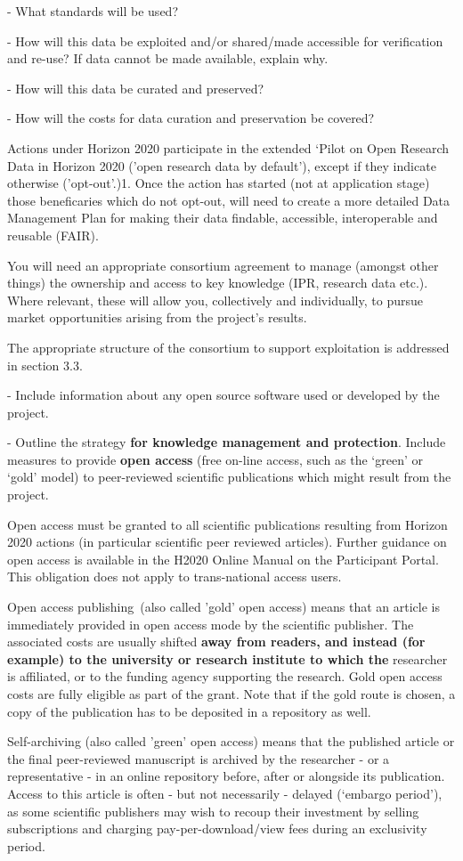 \begin{todo}{}
    - What standards will be used?
    
    - How will this data be exploited and/or shared/made accessible for verification and re-use? If data cannot be made available, explain why.
    
    - How will this data be curated and preserved?
    
    - How will the costs for data curation and preservation be covered?

Actions under Horizon 2020 participate in the extended ‘Pilot on Open Research Data in Horizon 2020 ('open research data by default'), except if they indicate otherwise ('opt-out'.)1. Once the action has started (not at application stage) those beneficaries which do not opt-out, will need to create a more detailed Data Management Plan for making their data findable, accessible, interoperable and reusable (FAIR).

You will need an appropriate consortium agreement to manage (amongst other things) the ownership and access to key knowledge (IPR, research data etc.). Where relevant, these will allow you, collectively and individually, to pursue market opportunities arising from the project's results.

The appropriate structure of the consortium to support exploitation is addressed in section 3.3.

    - Include information about any open source software used or developed by the project.

    - Outline the strategy {\bf for knowledge management and protection}. Include measures to provide {\bf open access} (free on-line access, such as the ‘green’ or ‘gold’ model) to peer-reviewed scientific publications which might result from the project.

    Open access must be granted to all scientific publications resulting from Horizon 2020 actions (in particular scientific peer reviewed articles). Further guidance on open access is available in the H2020 Online Manual on the Participant Portal. This obligation does not apply to trans-national access users.

    Open access publishing (also called 'gold' open access) means that an article is immediately provided in open access mode by the scientific publisher. The associated costs are usually shifted {\bf away from readers, and instead (for example) to the university or research institute to which the} researcher is affiliated, or to the funding agency supporting the research. Gold open access costs are fully eligible as part of the grant. Note that if the gold route is chosen, a copy of the publication has to be deposited in a repository as well.

    Self-archiving (also called 'green' open access) means that the published article or the final peer-reviewed manuscript is archived by the researcher - or a representative - in an online repository before, after or alongside its publication. Access to this article is often - but not necessarily - delayed (‘embargo period’), as some scientific publishers may wish to recoup their investment by selling subscriptions and charging pay-per-download/view fees during an exclusivity period.
\end{todo}






